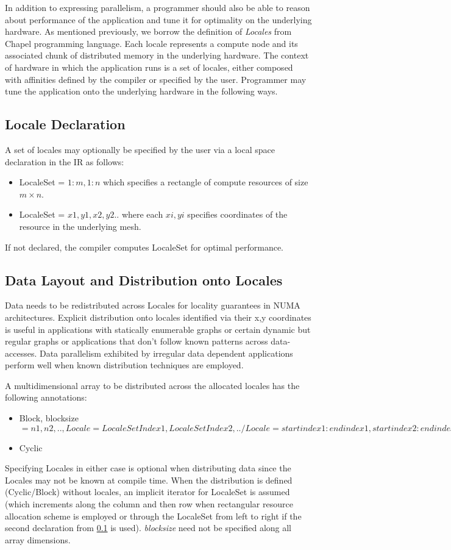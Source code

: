 In addition to expressing parallelism, a programmer should also be able to reason about performance of the application and tune it for optimality on the underlying hardware. As mentioned previously, we borrow the definition of \textit{Locales} from Chapel\cite{} programming language. Each locale represents a compute node and its associated chunk of distributed memory in the underlying hardware.
The context of hardware in which the application runs is a set of locales, either composed with affinities defined by the compiler or specified by the user. Programmer may tune the application onto the underlying hardware in the following ways.
\subsection{Locale Declaration}
\label{subsec_localeset}
A set of locales may optionally be specified by the user via a local space declaration in the IR as follows:
\begin{itemize}
 \item LocaleSet = ${1:m,1:n}$ which specifies a rectangle of compute resources of size $m\times n$.
 \item LocaleSet = ${{x1,y1},{x2,y2}..}$ where each ${xi,yi}$ specifies coordinates of the resource in the underlying mesh.
\end{itemize}
If not declared, the compiler computes LocaleSet for optimal performance. 

\subsection{Data Layout and Distribution onto Locales}
Data needs to be redistributed across Locales for locality guarantees in NUMA architectures. Explicit distribution onto locales identified via their {x,y} coordinates is useful in applications with statically enumerable graphs or certain dynamic but regular graphs or applications that don't follow known patterns across data-accesses. Data parallelism exhibited by irregular data dependent applications perform well when known distribution techniques are employed.

A multidimensional array to be distributed across the allocated locales has the following annotations:\\
\begin{itemize}
\item {Block, blocksize$={n1,n2,..}, Locale={LocaleSet Index1, LocaleSet Index2,..}/Locale={start index1:end index1, start index2:end index2}$}
\item {Cyclic}
\end{itemize}
Specifying Locales in either case is optional when distributing data since the Locales may not be known at compile time. When the distribution is defined (Cyclic/Block) without locales, an implicit iterator for LocaleSet is assumed (which increments along the column and then row when rectangular resource allocation scheme is employed or through the LocaleSet from left to right if the second declaration from \ref{subsec_localeset} is used). \textit{blocksize} need not be specified along all array dimensions.

